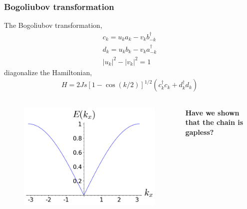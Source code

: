 \documentclass{beamer}
\begin{document}
\begin{frame}
    \frametitle{Bogoliubov transformation}
    The Bogoliubov transformation, 
    \begin{align*}
        c_k = u_k a_k -v_k b^\dagger_{-k} \nonumber \\
        d_k = u_k b_k - v_k a^\dagger_{-k} \nonumber \\ 
        |u_k|^2 - |v_k|^2 = 1
    \end{align*}
    diagonalize the Hamiltonian, 
    \begin{align*}
        H = 2Js\left[ 1-\cos(k/2) \right]^{1/2} (c^\dagger_k c_k + d^\dagger_k d_k)
    \end{align*} 
    \begin{columns}
    \begin{column}{0.6\textwidth}
        \begin{figure}[h]
            \centering
            \includegraphics[scale=0.25]{tmp_8wmjqz4x.png}
            \label{spinwave_energy}
        \end{figure}
    \end{column}
    \begin{column}{0.4\textwidth}
        \textbf{Have we shown that the chain is gapless?}
    \end{column}
    \end{columns}
\end{frame}
\end{document}
